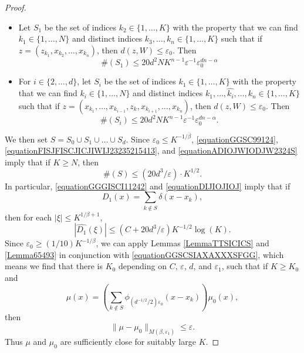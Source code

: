 \documentclass[12pt,reqno]{article}
\numberwithin{equation}{section}
\begin{document}
\begin{proof}
\begin{itemize}
        \item Let $S_1$ be the set of indices $k_2 \in \{ 1, \dots, K \}$ with the property that we can find $k_1 \in \{ 1, \dots, N \}$ and distinct indices $k_3, \dots, k_n \in \{ 1, \dots, K \}$ such that if $z = (z_{k_1}, x_{k_2}, \dots, x_{k_n})$, then $d(z,W) \leq \varepsilon_0$. Then
        \begin{equation} \label{equationFISJFISCJICJIWIJ23235215413}
            \#(S_1) \leq 20 d^2 N K^{n-1} \varepsilon^{-1} \varepsilon_0^{dn - \alpha}
        \end{equation}

        \item For $i \in \{ 2, \dots, d \}$, let $S_i$ be the set of indices $k_1 \in \{ 1, \dots, K \}$ with the property that we can find $k_i \in \{ 1, \dots, N \}$ and distinct indices $k_1, \dots, \widehat{k_i}, \dots, k_n \in \{ 1, \dots, K \}$ such that if $z = (x_{k_1}, \dots, x_{k_{i-1}}, z_k, x_{k_{i+1}}, \dots, x_{k_n})$, then $d(z,W) \leq \varepsilon_0$. Then
        \begin{equation} \label{equationADIOJWIODJW2324S}
            \#(S_i) \leq 20 d^2 N K^{n-1} \varepsilon^{-1} \varepsilon_0^{dn - \alpha}.
        \end{equation}
    \end{itemize}
    We then set $S = S_0 \cup S_1 \cup \dots \cup S_d$. Since $\varepsilon_0 \leq K^{-1/\beta}$, \eqref{equationGGSC99124}, \eqref{equationFISJFISCJICJIWIJ23235215413}, and \eqref{equationADIOJWIODJW2324S} imply that if $K \geq N$, then
    \begin{equation} \label{equationDIJIOJIOJ}
        \#(S) \leq (20d^3/\varepsilon) \cdot K^{1/2}.
    \end{equation}
    In particular, \eqref{equationGGGISCI11242} and \eqref{equationDIJIOJIOJ} imply that if
    \[ D_1(x) = \sum_{k \not \in S} \delta(x - x_k), \]
    then for each $|\xi| \leq K^{1/\beta + 1}$,
    \begin{equation} \label{equationGGSCSIAXAXXXSFGG}
        |\widehat{D_1}(\xi)| \leq (C+20 d^3/\varepsilon) K^{-1/2} \log(K).
    \end{equation}
    Since $\varepsilon_0 \geq (1/10) K^{-1/\beta}$, we can apply Lemmas \ref{LemmaTTSICICS} and \ref{Lemma65493} in conjunction with \eqref{equationGGSCSIAXAXXXSFGG}, which means we find that there is $K_0$ depending on $C$, $\varepsilon$, $d$, and $\varepsilon_1$, such that if $K \geq K_0$ and
    \[ \mu(x) = \left( \sum_{k \not \in S} \phi_{(d^{-1/2}/2) \varepsilon_0}(x - x_k) \right) \mu_0(x), \]
    then
    \begin{equation} \label{equationvVVV323285853S}
        \| \mu - \mu_0 \|_{M(\beta,\varepsilon_1)} \leq \varepsilon.
    \end{equation}
    Thus $\mu$ and $\mu_0$ are sufficiently close for suitably large $K$.


\end{proof}
\end{document}
